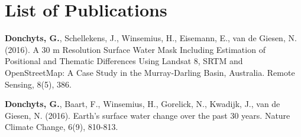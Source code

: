 \chapter*{List of Publications}
\label{publications}

\begin{etaremune}{\small

\item \textbf{Donchyts, G.}, Schellekens, J., Winsemius, H., Eisemann, E., van de Giesen, N. (2016). A 30 m Resolution Surface Water Mask Including Estimation of Positional and Thematic Differences Using Landsat 8, SRTM and OpenStreetMap: A Case Study in the Murray-Darling Basin, Australia. Remote Sensing, 8(5), 386.

\item \textbf{Donchyts, G.}, Baart, F., Winsemius, H., Gorelick, N., Kwadijk, J., van de Giesen, N. (2016). Earth's surface water change over the past 30 years. Nature Climate Change, 6(9), 810-813.


}\end{etaremune}

